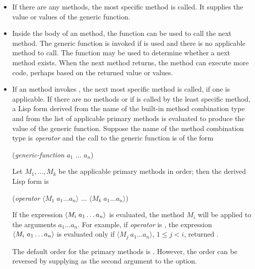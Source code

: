 \begin{itemize}
\item 
If there are any  methods, the most specific 
method is called.   It supplies the value or values of the generic function. 

\item  Inside the body of an  method, the function
 can be used to call the next method.  The
generic function  is invoked if 
 is used and there is no applicable method to call.
The function  may be used to determine whether a
next method exists. When the next method returns, the 
method can execute more code, perhaps based on the returned value or
values.

\item  If an  method invokes 
, the next most specific  method is
called, if one is applicable.  If there are no  methods
or if  is called by the least specific 
 method, a Lisp form derived from the name of the built-in
method combination type and from the list of applicable primary
methods is evaluated to produce the value of the generic function.
Suppose the name of the method combination type is \emph{operator\/}
and the call to the generic function is of the form
\begin{lisp}
(\emph{generic-function\/} $a_1$ ... $a_{n}$)
\end{lisp}
Let $M_1,\ldots,M_{k}$ be the applicable primary methods
in order; then the derived Lisp form is
\begin{lisp}
(\emph{operator\/} $\langle M_1\;a_1\ldots a_{n}\rangle$
... $\langle M_k\;a_1\ldots a_{n}\rangle$)
\end{lisp}
If the expression $\langle M_{i} \;a_1\ldots a_
{n}\rangle$ is
evaluated, the method $M_i$ will be applied to the arguments
$a_1\ldots a_{n}$.  
For example,
if \emph{operator\/} is ,
the expression $\langle M_{i} \ a_1\ldots a_{n}\rangle$ is
evaluated only if $\langle M_{j} \ a_1\ldots a_{n}\rangle$,
$1\leq j<i$, returned .

The default order for the primary methods is 
.  However, the order can be reversed by supplying
 as the second argument to the 
 option.

\end{itemize}

